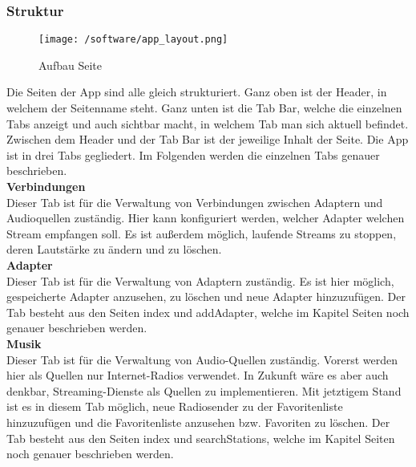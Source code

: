 \documentclass[11pt, twoside]{article}
\begin{document}
\subsubsection{Struktur}
\begin{figure}
\texttt{[image: /software/app\_layout.png]}
\caption{Aufbau Seite}
\end{figure}
\FloatBarrier
Die Seiten der App sind alle gleich strukturiert. Ganz oben ist der Header, in welchem der Seitenname steht. Ganz unten ist die Tab Bar, welche die einzelnen Tabs anzeigt und auch sichtbar macht, in welchem Tab man sich aktuell befindet. Zwischen dem Header und der Tab Bar ist der jeweilige Inhalt der Seite.
Die App ist in drei Tabs gegliedert. Im Folgenden werden die einzelnen Tabs genauer beschrieben. \newline \\
\textbf{Verbindungen} \\
Dieser Tab ist für die Verwaltung von Verbindungen zwischen Adaptern und Audioquellen zuständig. Hier kann konfiguriert werden, welcher Adapter welchen Stream empfangen soll. Es ist außerdem möglich, laufende Streams zu stoppen, deren Lautstärke zu ändern und zu löschen. \newline \\
\textbf{Adapter} \\
Dieser Tab ist für die Verwaltung von Adaptern zuständig. Es ist hier möglich, gespeicherte Adapter anzusehen, zu löschen und neue Adapter hinzuzufügen. Der Tab besteht aus den Seiten index und addAdapter, welche im Kapitel Seiten noch genauer beschrieben werden.  \newline \\
\textbf{Musik} \\
Dieser Tab ist für die Verwaltung von Audio-Quellen zuständig. Vorerst werden hier als Quellen nur Internet-Radios verwendet. In Zukunft wäre es aber auch denkbar, Streaming-Dienste als Quellen zu implementieren. Mit jetztigem Stand ist es in diesem Tab möglich, neue Radiosender zu der Favoritenliste hinzuzufügen und die Favoritenliste anzusehen bzw. Favoriten zu löschen. Der Tab besteht aus den Seiten index und searchStations, welche im Kapitel Seiten noch genauer beschrieben werden. \newline \\
\end{document}
